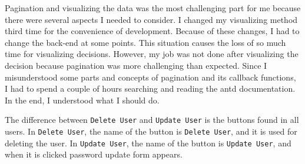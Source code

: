 Pagination and visualizing the data was the most challenging part for me because there were several aspects I needed to consider. I changed my visualizing method third time for the convenience of development. Because of these changes, I had to change the back-end at some points. This situation causes the loss of so much time for visualizing decisions. However, my job was not done after visualizing the decision because pagination was more challenging than expected. Since I misunderstood some parts and concepts of pagination and its callback functions, I had to spend a couple of hours searching and reading the antd documentation. In the end, I understood what I should do.

The difference between \texttt{Delete User} and \texttt{Update User} is the buttons found in all users. In \texttt{Delete User}, the name of the button is \texttt{Delete User}, and it is used for deleting the user. In \texttt{Update User}, the name of the button is \texttt{Update User}, and when it is clicked password update form appears.


